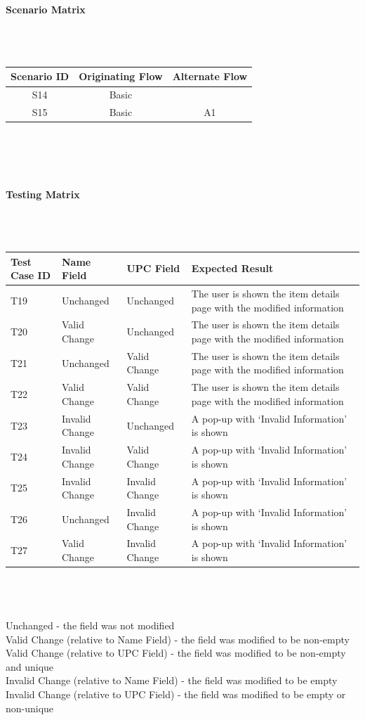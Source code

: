 \documentclass{article}
\begin{document}
\paragraph{Scenario Matrix}~\\ \\
\begin{tabular}{ c  c  c }
\hline
Scenario ID & Originating Flow & Alternate Flow\\
\hline
\hline
S14 & Basic & \\
\hline
S15 & Basic & A1\\
\hline
\end{tabular}\\
~\\
~\\
\paragraph{Testing Matrix}~\\ \\
\begin{tabular}{ p{0.8in}  p{0.9in}  p{0.9in}  p{2.8in}}
\hline
Test Case ID & Name Field & UPC Field & Expected Result\\
\hline
\hline
T19 & Unchanged & Unchanged & The user is shown the item details page with the modified information\\
\hline
T20 & Valid Change & Unchanged & The user is shown the item details page with the modified information\\
\hline
T21 & Unchanged & Valid Change & The user is shown the item details page with the modified information\\
\hline
T22 & Valid Change & Valid Change & The user is shown the item details page with the modified information\\
\hline
T23 & Invalid Change & Unchanged & A pop-up with `Invalid Information' is shown\\
\hline
T24 & Invalid Change & Valid Change & A pop-up with `Invalid Information' is shown\\
\hline
T25 & Invalid Change & Invalid Change & A pop-up with `Invalid Information' is shown\\
\hline
T26 & Unchanged & Invalid Change & A pop-up with `Invalid Information' is shown\\
\hline
T27 & Valid Change & Invalid Change & A pop-up with `Invalid Information' is shown\\
\hline
\end{tabular}\\
~\\
~\\
Unchanged - the field was not modified\\
Valid Change (relative to Name Field) - the field was modified to be non-empty\\
Valid Change (relative to UPC Field) - the field was modified to be non-empty and unique\\
Invalid Change (relative to Name Field) - the field was modified to be empty\\
Invalid Change (relative to UPC Field) - the field was modified to be empty or non-unique
\end{document}
